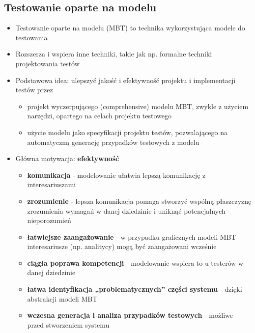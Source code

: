 \documentclass[../main.tex]{subfiles}
\begin{document}
    \subsection{Testowanie oparte na modelu}
    \begin{itemize}
        \item Testowanie oparte na modelu (MBT) to technika wykorzystująca modele do testowania
        \item Rozszerza i wspiera inne techniki, takie jak np. formalne techniki projektowania testów
        \item Podstawowa idea: ulepszyć jakość i efektywność projektu i implementacji testów przez
        \begin{itemize}
            \item projekt wyczerpującego (comprehensive) modelu MBT, zwykle z użyciem narzędzi, opartego na celach projektu testowego
            \item użycie modelu jako specyfikacji projektu testów, pozwalającego na automatyczną generację przypadków testowych z modelu
        \end{itemize}

        \item Główna motywacja: \textbf{efektywność}
        \begin{itemize}
            \item \textbf{komunikacja} - modelowanie ułatwia lepszą
            komunikację z interesariuszami
            \item \textbf{zrozumienie} - lepsza komunikacja pomaga stworzyć wspólną
            płaszczyznę zrozumienia wymagań w danej dziedzinie i uniknąć potencjalnych nieporozumień
            \item \textbf{łatwiejsze zaangażowanie} - w przypadku graficznych modeli MBT interesariusze
            (np. analitycy) mogą być zaangażowani wcześnie
            \item \textbf{ciągła poprawa kompetencji} - modelowanie wspiera to
            u testerów w danej dziedzinie
            \item \textbf{łatwa identyfikacja „problematycznych” części systemu} - dzięki abstrakcji modeli MBT
            \item \textbf{wczesna generacja i analiza przypadków testowych} - możliwe przed stworzeniem systemu
        \end{itemize}


\end{itemize}
\end{document}
